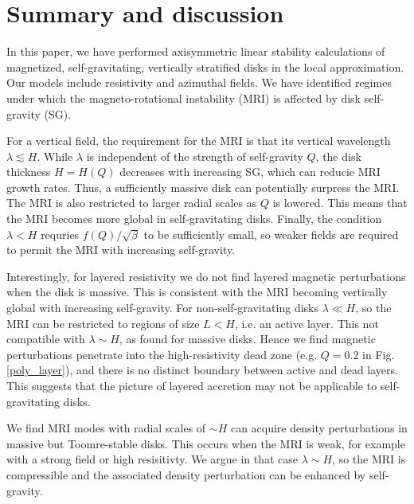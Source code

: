 \section{Summary and discussion}\label{summary}
In this paper, we have performed axisymmetric linear stability
calculations of magnetized, self-gravitating, vertically stratified
disks in the local approximation. Our models include resistivity and
azimuthal fields. We have identified regimes under which the
magneto-rotational instability (MRI) is affected by disk self-gravity
(SG).   


For a vertical field, the requirement for the MRI is that   
its vertical wavelength $\lambda \lesssim H$. While $\lambda$ is independent of
the strength of self-gravity $Q$, the disk thickness $H=H(Q)$ 
decreases with increasing SG, which can reducie MRI growth rates. 
Thus, a sufficiently massive disk can potentially surpress the MRI. 
The MRI is also restricted to larger radial
scales as $Q$ is lowered. This means that the MRI becomes more global
in self-gravitating disks. Finally, the condition $\lambda < H$ 
requries $f(Q)/\sqrt{\beta}$ to be sufficiently small, so weaker
fields are required to permit the MRI with increasing self-gravity.   
 
Interestingly, for layered resistivity we do not find layered
magnetic perturbations when the disk is massive. This is 
consistent with the MRI becoming vertically global with increasing self-gravity.    
For non-self-gravitating disks $\lambda\ll H$, so the MRI can be
restricted to regions of size $L<H$, i.e. an active layer. This not
compatible with $\lambda \sim H$, as found for massive disks. Hence we
find magnetic perturbations penetrate into the high-resistivity dead
zone (e.g. $Q=0.2$ in Fig. \ref{poly_layer}), and there is no distinct
boundary between active and dead layers. This suggests that the
picture of layered accretion  \citep[e.g.][]{fleming03} may not be applicable 
to self-gravitating disks.  

We find MRI modes with radial scales of $\sim H$ can acquire  
density perturbations in massive but Toomre-stable disks. 
This occurs when the MRI is weak, for example with a strong field or
high resisitivty. We argue in that case $\lambda\sim H$, so the MRI is
compressible and the associated density
perturbation can be enhanced by self-gravity.

